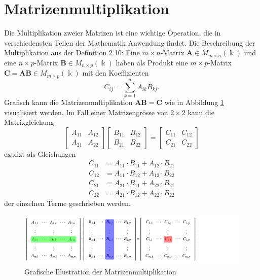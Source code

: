 %
%
%
\section{Matrizenmultiplikation \label{multiplikation:section:einleitung}}

Die Multiplikation zweier Matrizen ist eine wichtige Operation, die in verschiedensten Teilen der Mathematik Anwendung findet.
Die Beschreibung der Multiplikation aus der Definition 2.10:
Eine $m\times n$-Matrix $\mathbf{A}\in M_{m\times n}(\Bbbk)$ und eine
$n\times p$-Matrix $\mathbf{B}\in M_{n\times p}(\Bbbk)$ haben als Produkt
eine $m\times p$-Matrix $\mathbf{C}=\mathbf{AB}\in M_{m\times p}(\Bbbk)$ mit den
Koeffizienten
\begin{equation}
C_{i\!j} = \sum_{k=1}^n A_{ik} B_{k\!j}.
\label{multiplikation:eq:MM}
\end{equation}
Grafisch kann die Matrizenmultiplikation $\mathbf{AB}=\mathbf{C}$ wie in Abbildung \ref{multiplikation:fig:mm_viz} visualisiert werden.
%
%
Im Fall einer Matrizengr\"osse von $2\times 2$ kann die Matrixgleichung
\begin{equation}
  \begin{bmatrix}
A_{11} & A_{12}\\
A_{21} & A_{22}
\end{bmatrix}
\begin{bmatrix}
B_{11} & B_{12}\\
B_{21} & B_{22}
\end{bmatrix}
=
\begin{bmatrix}
C_{11} & C_{12}\\
C_{21} & C_{22}
\end{bmatrix}
\end{equation}
explizt als Gleichungen
\begin{equation} \label{multiplikation:eq:MM_exp}
\begin{split}
C_{11} &= A_{11} \cdot B_{11} + A_{12} \cdot B_{21}\\
C_{12} &= A_{11} \cdot B_{12} + A_{12} \cdot B_{22}\\
C_{21} &= A_{21} \cdot B_{11} + A_{22} \cdot B_{21}\\
C_{22} &= A_{21} \cdot B_{12} + A_{22} \cdot B_{22}
\end{split}
\end{equation}
der einzelnen Terme geschrieben werden.
\begin{figure}
	\center
	\includegraphics[]{papers/multiplikation/images/mm_visualisation}
	\caption{Grafische Illustration der Matrizenmultiplikation}
	\label{multiplikation:fig:mm_viz}
\end{figure}

